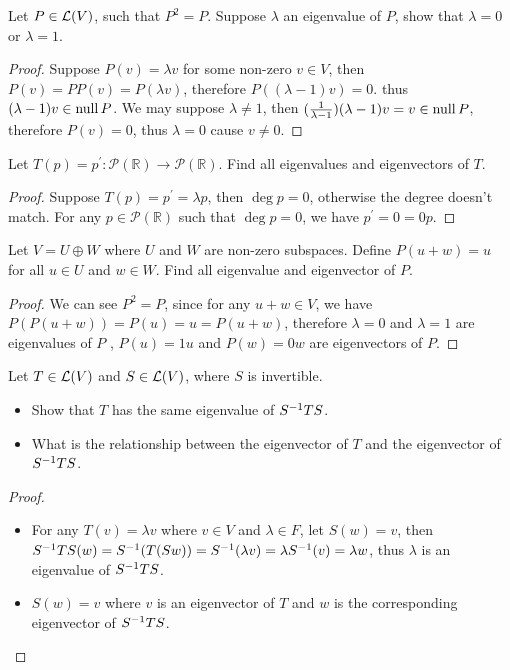 \documentclass[../main.tex]{subfiles}
\begin{document}
\setcounter{exercise}{8}
\begin{exercise}
  Let $P \in \mathcal{L}(V)$, such that $P^2 = P$. Suppose $\lambda$
  an eigenvalue of $P$, show that $\lambda = 0$ or $\lambda = 1$.
\end{exercise}
\begin{proof}
  Suppose $P(v) = \lambda v$ for some non-zero $v \in V$,
  then $P(v) = PP(v) = P(\lambda v)$, therefore $P((\lambda - 1) v) = 0$.
  thus $(\lambda - 1) v \in \operatorname{null} P$. We may suppose $\lambda \neq 1$,
  then $(\frac{1}{\lambda - 1}) (\lambda - 1) v = v \in \operatorname{null} P$, therefore $P(v) = 0$,
  thus $\lambda = 0$ cause $v \neq 0$.
\end{proof}

\begin{exercise}
  Let $T(p) = p^\prime : \mathcal{P}(\mathbb{R}) \rightarrow \mathcal{P}(\mathbb{R})$.
  Find all eigenvalues and eigenvectors of $T$.
\end{exercise}
\begin{proof}
  Suppose $T(p) = p^\prime = \lambda p$, then $\deg p = 0$, otherwise the degree doesn't match.
  For any $p \in \mathcal{P}(\mathbb{R})$ such that $\deg p = 0$, we have
  $p^\prime = 0 = 0p$.
\end{proof}

\setcounter{exercise}{11}
\begin{exercise}
  Let $V = U \oplus W$ where $U$ and $W$ are non-zero subspaces.
  Define $P(u + w) = u$ for all $u \in U$ and $w \in W$.
  Find all eigenvalue and eigenvector of $P$.
\end{exercise}
\begin{proof}
  We can see $P^2 = P$, since for any $u + w \in V$, we have $P(P(u + w)) = P(u) = u = P(u + w)$,
  therefore $\lambda = 0$ and $\lambda = 1$ are eigenvalues of $P$
  , $P(u) = 1u$ and $P(w) = 0w$ are eigenvectors of $P$.
\end{proof}

\begin{exercise}
  Let $T \in \mathcal{L}(V)$ and $S \in \mathcal{L}(V)$, where $S$ is invertible.
  \begin{itemize}
    \item Show that $T$ has the same eigenvalue of $S^{-1}TS$.
    \item What is the relationship between the eigenvector of $T$ and the eigenvector of $S^{-1}TS$.
  \end{itemize}
\end{exercise}
\begin{proof}
  ~
  \begin{itemize}
    \item For any $T(v) = \lambda v$ where $v \in V$ and $\lambda \in F$,
          let $S(w) = v$, then $S^{-1}TS(w) = S^{-1}(T(Sw)) = S^{-1}(\lambda v) = \lambda S^{-1}(v) = \lambda w$,
          thus $\lambda$ is an eigenvalue of $S^{-1}TS$.
    \item $S(w) = v$ where $v$ is an eigenvector of $T$ and $w$ is the corresponding eigenvector of $S^{-1}TS$.
  \end{itemize}
\end{proof}
\end{document}
